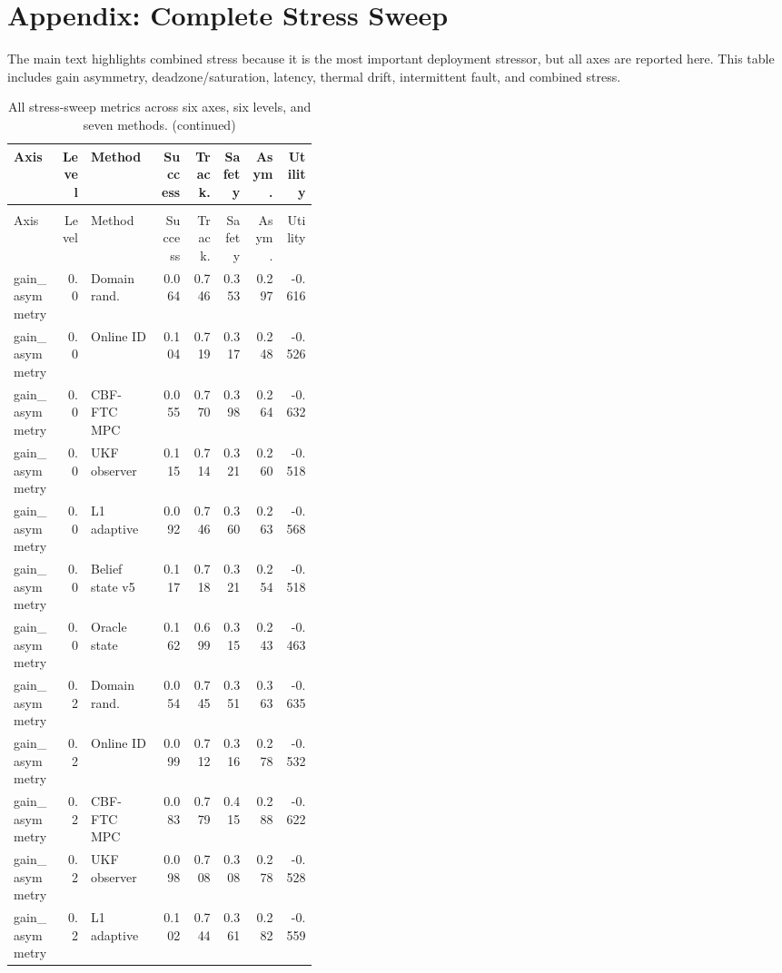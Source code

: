 \documentclass{article}
\begin{document}
\section{Appendix: Complete Stress Sweep}
The main text highlights combined stress because it is the most important deployment stressor, but all axes are reported here. This table includes gain asymmetry, deadzone/saturation, latency, thermal drift, intermittent fault, and combined stress.
\begin{center}
\tiny
\begin{longtable}{p{0.16\linewidth}rp{0.23\linewidth}rrrrr}
\caption{All stress-sweep metrics across six axes, six levels, and seven methods.}\label{tab:full-stress}\\
\toprule
Axis & Level & Method & Success & Track. & Safety & Asym. & Utility\\
\midrule
\endfirsthead
\caption[]{All stress-sweep metrics across six axes, six levels, and seven methods. (continued)}\\
\toprule
Axis & Level & Method & Success & Track. & Safety & Asym. & Utility\\
\midrule
\endhead
gain\_asymmetry & 0.0 & Domain rand. & 0.064 & 0.746 & 0.353 & 0.297 & -0.616\\
gain\_asymmetry & 0.0 & Online ID & 0.104 & 0.719 & 0.317 & 0.248 & -0.526\\
gain\_asymmetry & 0.0 & CBF-FTC MPC & 0.055 & 0.770 & 0.398 & 0.264 & -0.632\\
gain\_asymmetry & 0.0 & UKF observer & 0.115 & 0.714 & 0.321 & 0.260 & -0.518\\
gain\_asymmetry & 0.0 & L1 adaptive & 0.092 & 0.746 & 0.360 & 0.263 & -0.568\\
gain\_asymmetry & 0.0 & Belief state v5 & 0.117 & 0.718 & 0.321 & 0.254 & -0.518\\
gain\_asymmetry & 0.0 & Oracle state & 0.162 & 0.699 & 0.315 & 0.243 & -0.463\\
gain\_asymmetry & 0.2 & Domain rand. & 0.054 & 0.745 & 0.351 & 0.363 & -0.635\\
gain\_asymmetry & 0.2 & Online ID & 0.099 & 0.712 & 0.316 & 0.278 & -0.532\\
gain\_asymmetry & 0.2 & CBF-FTC MPC & 0.083 & 0.779 & 0.415 & 0.288 & -0.622\\
gain\_asymmetry & 0.2 & UKF observer & 0.098 & 0.708 & 0.308 & 0.278 & -0.528\\
gain\_asymmetry & 0.2 & L1 adaptive & 0.102 & 0.744 & 0.361 & 0.282 & -0.559\\

\end{longtable}
\end{center}
\end{document}
